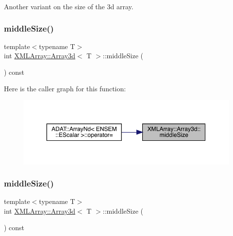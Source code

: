 Another variant on the size of the 3d array. 

\mbox{\label{classXMLArray_1_1Array3d_aa28ef386c7869c03b34f5a24a55bfde2}} 
\subsubsection{\texorpdfstring{middleSize()}{middleSize()}\hspace{0.1cm}{\footnotesize\ttfamily [1/2]}}
{\footnotesize\ttfamily template$<$typename T$>$ \\
int \mbox{\hyperlink{classXMLArray_1_1Array3d}{X\+M\+L\+Array\+::\+Array3d}}$<$ T $>$\+::middle\+Size (\begin{DoxyParamCaption}{ }\end{DoxyParamCaption}) const\hspace{0.3cm}{\ttfamily [inline]}}

Here is the caller graph for this function\+:\nopagebreak
\begin{figure}[H]
\begin{center}
\leavevmode
\includegraphics[width=350pt]{db/da0/classXMLArray_1_1Array3d_aa28ef386c7869c03b34f5a24a55bfde2_icgraph}
\end{center}
\end{figure}
\mbox{\label{classXMLArray_1_1Array3d_aa28ef386c7869c03b34f5a24a55bfde2}} 
\subsubsection{\texorpdfstring{middleSize()}{middleSize()}\hspace{0.1cm}{\footnotesize\ttfamily [2/2]}}
{\footnotesize\ttfamily template$<$typename T$>$ \\
int \mbox{\hyperlink{classXMLArray_1_1Array3d}{X\+M\+L\+Array\+::\+Array3d}}$<$ T $>$\+::middle\+Size (\begin{DoxyParamCaption}{ }\end{DoxyParamCaption}) const\hspace{0.3cm}{\ttfamily [inline]}}

